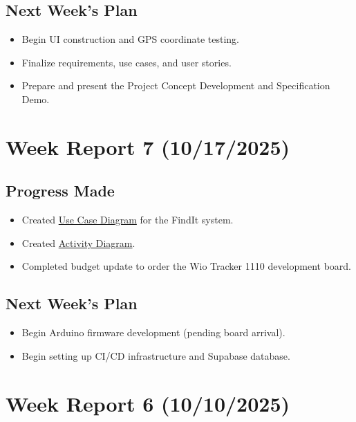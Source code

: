 \subsection{Next Week's Plan}
\begin{itemize}
    \item Begin UI construction and GPS coordinate testing.
    \item Finalize requirements, use cases, and user stories.
    \item Prepare and present the Project Concept Development and Specification Demo.
\end{itemize}


\section{Week Report 7 (10/17/2025)}
\label{sec:report7}

\subsection{Progress Made}
\begin{itemize}
    \item Created \hyperref[fig:finditUseCases]{Use Case Diagram} for the FindIt system.
    \item Created \hyperref[fig:finditActivity1]{Activity Diagram}.
    \item Completed budget update to order the Wio Tracker 1110 development board.
\end{itemize}

\subsection{Next Week's Plan}
\begin{itemize}
    \item Begin Arduino firmware development (pending board arrival).
    \item Begin setting up CI/CD infrastructure and Supabase database.
\end{itemize}


\section{Week Report 6 (10/10/2025)}
\label{sec:report6}

